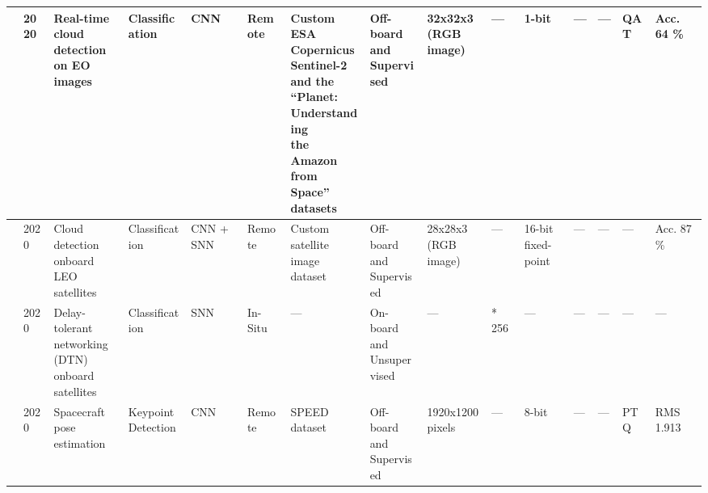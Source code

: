 \begin{center}
{\begin{tabular}{lllllllllllllll}
\cite{reiterFPGAAccelerationQuantized2020} & 2020 & \makecell[tl]{Real-time cloud\\ detection on EO\\ images} & Classification & CNN & Remote & \makecell[tl]{Custom ESA\\ Copernicus\\ Sentinel-2 \\ and the “Planet:\\ Understanding\\ the Amazon from\\ Space” datasets} & \makecell[tl]{Off-board\\ and\\ Supervised} & \makecell[tl]{32x32x3\\ (RGB image)} & --- & 1-bit & --- & --- & QAT & Acc. 64 \% \\ \hline
\cite{lemaireFPGAbasedHybridNeural2020} & 2020 & \makecell[tl]{Cloud detection\\ onboard LEO\\ satellites} & Classification & CNN + SNN & Remote & \makecell[tl]{Custom\\ satellite\\ image dataset} & \makecell[tl]{Off-board\\ and\\ Supervised} & \makecell[tl]{28x28x3\\ (RGB image)} & --- & \makecell[tl]{16-bit\\ fixed-point} & --- & --- & --- & Acc. 87 \% \\ \hline
\cite{lentEvaluatingCognitiveNetwork2020} & 2020 & \makecell[tl]{Delay-tolerant\\ networking\\ (DTN) onboard\\ satellites} & Classification & SNN & In-Situ & --- & \makecell[tl]{On-board\\ and\\ Unsupervised} & --- & * 256 & --- & --- & --- & --- & --- \\ \hline
\cite{cosmasUtilizationFPGAOnboard2020} & 2020 & \makecell[tl]{Spacecraft\\ pose\\ estimation} & \makecell[tl]{Keypoint\\ Detection} & CNN & Remote & SPEED dataset & \makecell[tl]{Off-board\\ and\\ Supervised} & \makecell[tl]{1920x1200\\ pixels} & --- & 8-bit & --- & --- & PTQ & RMS 1.913 \\ \hline

\end{tabular}}
\end{center}
